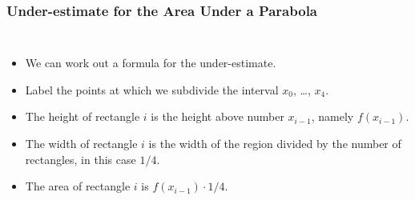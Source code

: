 \documentclass[serif,ignorenonframetext]{beamer}
\begin{document}
\begin{frame}
  \frametitle{Under-estimate for the Area Under a Parabola}
  \begin{columns}
  \begin{itemize}[<+->]
  \item We can work out a formula for the under-estimate.
  \item Label the points at which we subdivide the interval $x_0$,
    \ldots, $x_4$.
  \item The height of rectangle $i$ is the height above number $x_{i-1}$,
    namely $f(x_{i-1})$.
  \item The width of rectangle $i$ is the width of the region divided by
    the number of rectangles, in this case $1/4$.
  \item The area of rectangle $i$ is $f(x_{i-1})\cdot 1/4$.
  \end{itemize}
  \end{columns}
\end{frame}
\end{document}
